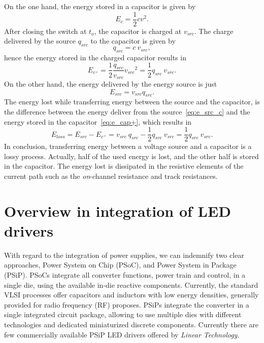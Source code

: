 On the one hand, the energy stored in a capacitor is given by
\begin{equation}
E_c = \frac{1}{2} c v^2.
\label{eq:e_cap}
\end{equation}
After closing the switch at $t_o$, the capacitor is charged at $v_{src}$.  The charge delivered by the source $q_{src}$ to the capacitor is given by
\begin{equation}
q_{src}= c~v_{src},
\label{eq:q_src_cap}
\end{equation}
hence the energy stored in the charged capacitor results in
\begin{equation}
E_{c^+} = \frac{1}{2} \frac{q_{src}}{v_{src}}  {v_{src}}^2 = \frac{1}{2}q_{src}~v_{src}.
\label{eq:e_cap+}
\end{equation}
On the other hand, the energy delivered by the energy source is just
\begin{equation}
E_{src} = v_{src} q_{src}.
\label{eq:e_src_c}
\end{equation}
The energy lost while transferring energy between the source and the capacitor, is the difference between the energy deliver from the source~\eqref{eq:e_src_c} and the energy stored in the capacitor~\eqref{eq:e_cap+}, which results in
\begin{equation}
E_{loss} = E_{src} - E_{c^+} = v_{src}~q_{src}  - \frac{1}{2}q_{src}~v_{src}  = \frac{1}{2}q_{src}~v_{src}.
\label{eq:e_loss_l}
\end{equation}
In conclusion, transferring energy between a voltage source and a capacitor is a lossy process. Actually, half of the used energy is lost, and the other half is stored in the capacitor. The energy lost is dissipated in the resistive elements of the current path such as the \emph{on}-channel resistance and track resistances.










\section{Overview in integration of LED drivers }
With regard to the integration of power supplies, we can indemnify two clear approaches, Power System on Chip (PSoC), and  Power System in Package (PSiP). PSoCs integrate all converter functions, power train and control, in a single die, using the available in-die reactive components. Currently, the standard VLSI processes offer capacitors and inductors with low energy densities, generally provided for radio frequency (RF) proposes. PSiPs integrate the converter in a single integrated circuit package, allowing to use multiple dies with different technologies and dedicated miniaturized discrete components. Currently there are few commercially available PSiP LED drivers offered by \emph{Linear Technology}.

